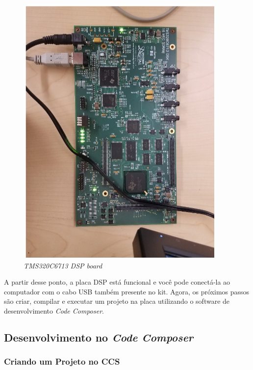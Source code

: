 \documentclass[a4paper, 12pt]{article}
\begin{document}
\begin{figure}[htbp!] 
	\begin{center}
		\includegraphics[scale=0.45]{dsp_on.png}
		\caption{\textit{TMS320C6713 DSP board}}
		\label{Fig:dspon}
	\end{center} 
\end{figure}

A partir desse ponto, a placa DSP está funcional e você pode conectá-la ao computador com o cabo USB também presente no kit. Agora, os próximos passos são criar, compilar e executar um projeto na placa utilizando o software de desenvolvimento \textit{Code Composer\texttrademark}.


\subsection{Desenvolvimento no \textit{Code Composer\texttrademark}}

\subsubsection{Criando um Projeto no CCS}
\end{document}
